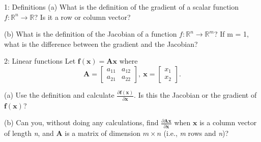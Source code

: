 \documentclass{article}
\begin{document}


\begin{problem}{1: Definitions}
(a) What is the definition of the gradient of a scalar function $\textit{f} : \mathbb{R}^{n} \to \mathbb{R}$? Is it a row or column vector?

\medskip

(b) What is the definition of the Jacobian of a function $\textit{f} : \mathbb{R}^{n} \to \mathbb{R}^{m}$? If m = 1, what is the difference between the gradient and the Jacobian?
\end{problem}

\begin{problem}{2: Linear functions}
Let $\mathbf{f(x)} = \mathbf{Ax}$ where
\[
  \mathbf{A} = 
  \begin{bmatrix}
    a_{11} & a_{12} \\
    a_{21} & a_{22}
  \end{bmatrix}
  ,\ 
  \mathbf{x} = 
  \begin{bmatrix}
    x_1 \\ x_2
  \end{bmatrix}
  .\]

(a) Use the definition and calculate $\frac{\partial\mathbf{f(x)}}{\partial\mathbf{x}}$. Is this the Jacobian or the gradient of $\mathbf{f(x)}$?

\medskip

(b) Can you, without doing any calculations, find $\frac{\partial\mathbf{Ax}}{\partial\mathbf{x}}$ when $\mathbf{x}$ is a 
column vector of length \textit{n}, and $\mathbf{A}$ is a matrix of dimension $m\times n$ (i.e., \textit{m} rows and \textit{n})?
\end{problem}
\end{document}
